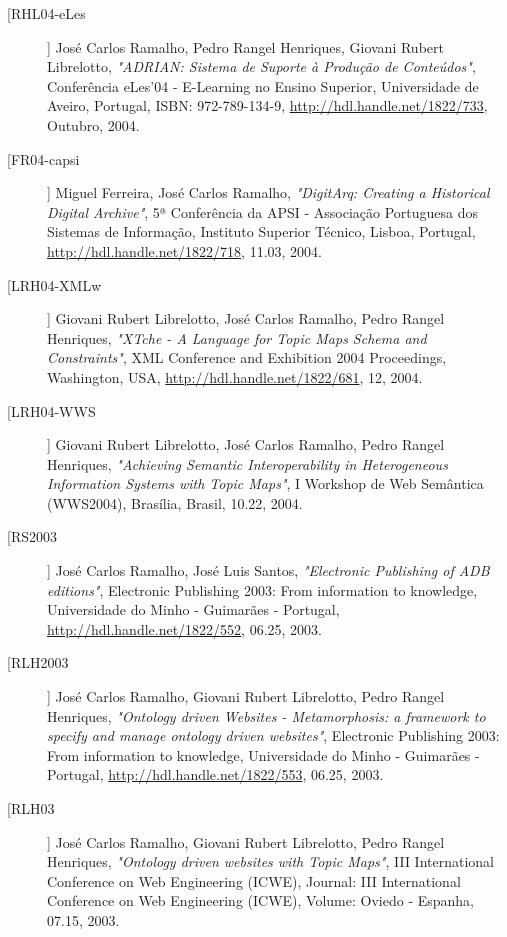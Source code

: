 \begin{description}
\item[[RHL04-eLes]]
    \textsf{José Carlos Ramalho, Pedro Rangel Henriques, Giovani Rubert Librelotto}, \emph{"ADRIAN: Sistema de Suporte à Produção de Conteúdos"}, Conferência eLes'04 - E-Learning no Ensino Superior, Universidade de Aveiro, Portugal, ISBN: 972-789-134-9, \url{http://hdl.handle.net/1822/733}, Outubro, 2004.

\item[[FR04-capsi]]
    \textsf{Miguel Ferreira, José Carlos Ramalho}, \emph{"DigitArq: Creating a Historical Digital Archive"}, 5ª Conferência da APSI - Associação Portuguesa dos Sistemas de Informação, Instituto Superior Técnico, Lisboa, Portugal, \url{http://hdl.handle.net/1822/718}, 11.03, 2004.

\item[[LRH04-XMLw]]
    \textsf{Giovani Rubert Librelotto, José Carlos Ramalho, Pedro Rangel Henriques}, \emph{"XTche - A Language for Topic Maps Schema and Constraints"}, XML Conference and Exhibition 2004 Proceedings, Washington, USA, \url{http://hdl.handle.net/1822/681}, 12, 2004.

\item[[LRH04-WWS]]
    \textsf{Giovani Rubert Librelotto, José Carlos Ramalho, Pedro Rangel Henriques}, \emph{"Achieving Semantic Interoperability in Heterogeneous Information Systems with Topic Maps"}, I  Workshop de Web Semântica (WWS2004), Brasília, Brasil, 10.22, 2004.

\item[[RS2003]]
    \textsf{José Carlos Ramalho, José Luis Santos}, \emph{"Electronic Publishing of ADB editions"}, Electronic Publishing 2003: From information to knowledge, Universidade do Minho - Guimarães - Portugal, \url{http://hdl.handle.net/1822/552}, 06.25, 2003.

\item[[RLH2003]]
    \textsf{José Carlos Ramalho, Giovani Rubert Librelotto, Pedro Rangel Henriques}, \emph{"Ontology driven Websites - Metamorphosis: a framework to specify and manage ontology driven websites"}, Electronic Publishing 2003: From information to knowledge, Universidade do Minho - Guimarães - Portugal, \url{http://hdl.handle.net/1822/553}, 06.25, 2003.

\item[[RLH03]]
    \textsf{José Carlos Ramalho, Giovani Rubert Librelotto, Pedro Rangel Henriques}, \emph{"Ontology driven websites with Topic Maps"}, III International Conference on Web Engineering (ICWE), Journal: III International Conference on Web Engineering (ICWE), Volume: Oviedo - Espanha, 07.15, 2003.


\end{description}
